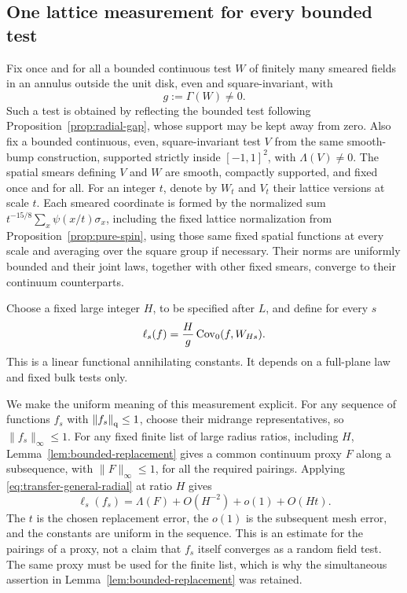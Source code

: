 \subsection{One lattice measurement for every bounded test}

Fix once and for all a bounded continuous test $W$ of finitely many
smeared fields in an annulus outside the unit disk, even and
square-invariant, with
\begin{equation}
 g:=\Gamma(W)\ne0.
 \label{eq:transfer-measuring-test}
\end{equation}
Such a test is obtained by reflecting the bounded test following
Proposition~\ref{prop:radial-gap}, whose support may be kept away
from zero.  Also fix a bounded continuous, even, square-invariant test
$V$ from the same smooth-bump construction, supported strictly inside
$[-1,1]^2$, with $\Lambda(V)\ne0$.  The spatial smears defining $V$
and $W$ are smooth, compactly supported, and fixed once and for all.
For an integer $t$, denote by $W_t$ and $V_t$ their lattice versions
at scale $t$.  Each smeared coordinate is formed by the normalized
sum $t^{-15/8}\sum_x\psi(x/t)\sigma_x$, including the fixed lattice
normalization from Proposition~\ref{prop:pure-spin}, using those same
fixed spatial functions at every scale and averaging over the square
group if necessary.  Their norms
are uniformly bounded and their joint laws, together with other fixed
smears, converge to their continuum counterparts.

Choose a fixed large integer $H$, to be specified after $L$, and define
for every $s$
\begin{equation}
 \ell_s(f)=\frac H g\operatorname{Cov}_0(f,W_{Hs}).
 \label{eq:transfer-measured-coefficient}
\end{equation}
This is a linear functional annihilating constants.  It depends on a
full-plane law and fixed bulk tests only.

We make the uniform meaning of this measurement explicit.  For any
sequence of functions $f_s$ with $\left\|f_s\right\|_{\mathrm q}\leq1$, choose their
midrange representatives, so $\|f_s\|_\infty\leq1$.
For any fixed finite list of large radius ratios, including $H$,
Lemma~\ref{lem:bounded-replacement} gives a common continuum proxy
$F$ along a subsequence, with $\|F\|_\infty\leq1$, for all the
required pairings.  Applying \eqref{eq:transfer-general-radial} at
ratio $H$ gives
\begin{equation}
 \ell_s(f_s)=\Lambda(F)+O(H^{-2})+o(1)+O(Ht).
 \label{eq:transfer-proxy-measurement}
\end{equation}
The $t$ is the chosen replacement error, the $o(1)$ is the subsequent
mesh error, and the constants are uniform in the sequence.  This is
an estimate for the pairings of a proxy, not a claim that $f_s$ itself
converges as a random field test.  The same proxy must be used for the
finite list, which is why the simultaneous assertion in
Lemma~\ref{lem:bounded-replacement} was retained.

